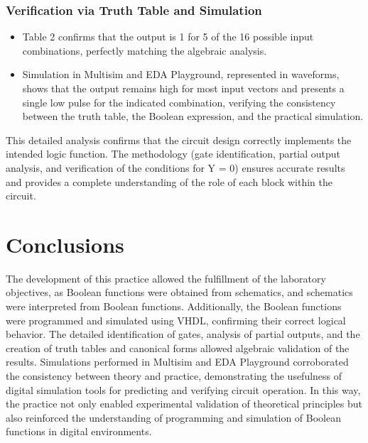 \documentclass[12pt]{article}  %
\begin{document}
\subsubsection{Verification via Truth Table and Simulation}
\begin{itemize}
    \item Table 2 confirms that the output is 1 for 5 of the 16 possible input combinations, perfectly matching the algebraic analysis.
    \item Simulation in Multisim and EDA Playground, represented in waveforms, shows that the output remains high for most input vectors and presents a single low pulse for the indicated combination, verifying the consistency between the truth table, the Boolean expression, and the practical simulation.
\end{itemize}
This detailed analysis confirms that the circuit design correctly implements the intended logic function. The methodology (gate identification, partial output analysis, and verification of the conditions for Y = 0) ensures accurate results and provides a complete understanding of the role of each block within the circuit.



\section{Conclusions} %
The development of this practice allowed the fulfillment of the laboratory objectives, as Boolean functions were obtained from schematics, and schematics were interpreted from Boolean functions. Additionally, the Boolean functions were programmed and simulated using VHDL, confirming their correct logical behavior. The detailed identification of gates, analysis of partial outputs, and the creation of truth tables and canonical forms allowed algebraic validation of the results. Simulations performed in Multisim and EDA Playground corroborated the consistency between theory and practice, demonstrating the usefulness of digital simulation tools for predicting and verifying circuit operation. In this way, the practice not only enabled experimental validation of theoretical principles but also reinforced the understanding of programming and simulation of Boolean functions in digital environments.
\clearpage %
\end{document}
